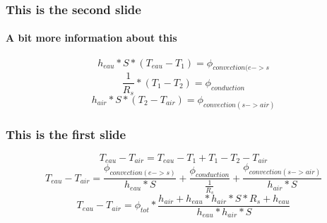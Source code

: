 \documentclass{beamer}
\begin{document}
  \begin{frame}
    \frametitle{This is the second slide}
    \framesubtitle{A bit more information about this}
    \[h_{eau}*S*(T_{eau} - T_{1}) = \phi_{convection(e->s}\]
    \[\frac{1}{R_{s}} * (T_{1} - T_{2}) = \phi_{conduction}\]
    \[h_{air}*S*(T_{2} - T_{air}) = \phi_{convection(s->air)}\]
  \end{frame}
  \begin{frame}
    \frametitle{This is the first slide}
    \[T_{eau} - T_{air} = T_{eau} - T_{1} + T_{1} - T_{2} - T_{air}\]
    \[T_{eau} - T_{air} = \frac{\phi_{convection(e->s)}}{h_{eau}*S} + \frac{\phi_{conduction}}{\frac{1}{R_{s}}} + \frac{\phi_{convection(s->air)}}{h_{air}*S} \]
    \[T_{eau} - T_{air} = \phi_{tot} * \frac{h_{air} + h_{eau}*h_{air}*S*R_{s} + h_{eau}}{h_{eau}*h_{air}*S}\]
  \end{frame}
\end{document}
